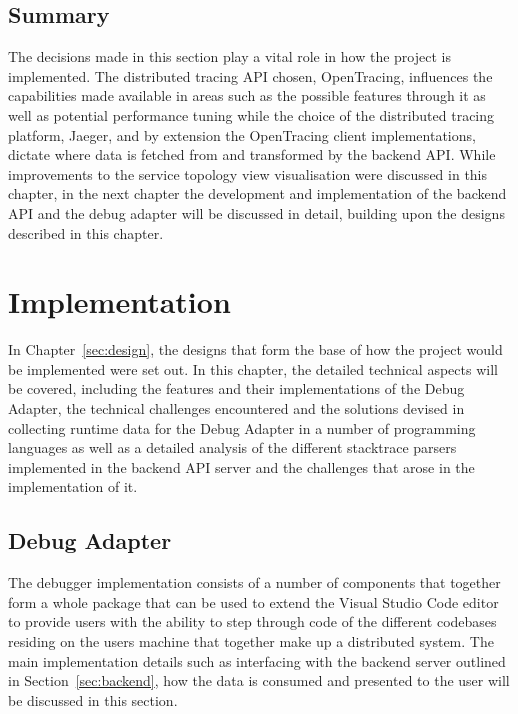 \documentclass[12pt,pdftex,titlepage]{report}
\begin{document}
        \section{Summary}
            The decisions made in this section play a vital role in how the project is implemented. The distributed tracing API chosen, OpenTracing, influences the capabilities made available in areas such as the possible features 
            through it as well as potential performance tuning while the choice of the distributed tracing platform, Jaeger, and by extension the OpenTracing client implementations, dictate where data is fetched from and transformed
            by the backend API. While improvements to the service topology view visualisation were discussed in this chapter, in the next chapter the development and implementation of the backend API and the debug adapter will be 
            discussed in detail, building upon the designs described in this chapter.

    \chapter{Implementation}
        In Chapter~{\ref{sec:design}}, the designs that form the base of how the project would be implemented were set out. In this chapter, the detailed technical aspects will be covered, including the features and their implementations
        of the Debug Adapter, the technical challenges encountered and the solutions devised in collecting runtime data for the Debug Adapter in a number of programming languages as well as a detailed analysis of the different stacktrace 
        parsers implemented in the backend API server and the challenges that arose in the implementation of it.

        \section{Debug Adapter}
        \label{sec:impldebug}
            The debugger implementation consists of a number of components that together form a whole package that can be used to extend the Visual Studio Code editor to provide users with the ability
            to step through code of the different codebases residing on the users machine that together make up a distributed system. The main implementation details such as interfacing with the backend
            server outlined in Section~\ref{sec:backend}, how the data is consumed and presented to the user will be discussed in this section.
\end{document}
